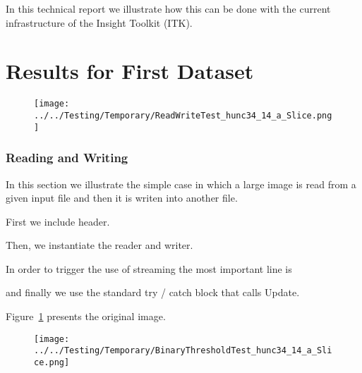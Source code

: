 \documentclass{InsightArticle}
\begin{document}
In this technical report we illustrate how this can be done with the current
infrastructure of the Insight Toolkit (ITK).

\part{Results for First Dataset}

\clearpage
\begin{figure}
\center
\texttt{[image: ../../Testing/Temporary/ReadWriteTest\_hunc34\_14\_a\_Slice.png]}
\label{fig:OriginalImage}
\end{figure}

\section{Reading and Writing}

In this section we illustrate the simple case in which a large image is read
from a given input file and then it is writen into another file.

First we include header.

\begin{center}

\end{center}

Then, we instantiate the reader and writer.

\begin{center}

\end{center}

In order to trigger the use of streaming the most important line is

\begin{center}

\end{center}

and finally we use the standard try / catch block that calls Update.

\begin{center}

\end{center}


Figure~\ref{fig:OriginalImage} presents the original image.



\clearpage
\begin{figure}
\center
\texttt{[image: ../../Testing/Temporary/BinaryThresholdTest\_hunc34\_14\_a\_Slice.png]}
\label{fig:BinaryImage}
\end{figure}
\end{document}
